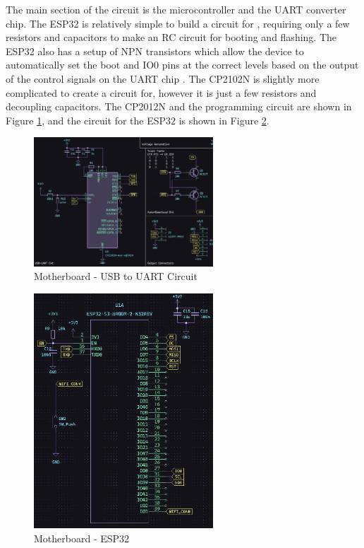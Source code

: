 \documentclass[12pt]{article}
\begin{document}
    The main section of the circuit is the microcontroller and the UART converter chip. The ESP32 is relatively simple to build a circuit for \cite{esp32}, requiring only a few resistors and capacitors to make an RC circuit for booting and flashing. The ESP32 also has a setup of NPN transistors which allow the device to automatically set the boot and IO0 pins at the correct levels based on the output of the control signals on the UART chip \cite{esp32, UART}. The CP2102N is slightly more complicated to create a circuit for, however it is just a few resistors and decoupling capacitors. The CP2012N and the programming circuit are shown in Figure \ref{pcb_uart}, and the circuit for the ESP32 is shown in Figure \ref{pcb_esp32}.

    \begin{figure}[hbt!]
        \centering
        \includegraphics[width=0.6\textwidth]{images/pcb_uart.png}
        \caption{Motherboard - USB to UART Circuit}
        \label{pcb_uart}
    \end{figure}

    \begin{figure}[hbt!]
        \centering
        \includegraphics[width=0.6\textwidth]{images/pcb_esp32.png}
        \caption{Motherboard - ESP32}
        \label{pcb_esp32}
    \end{figure}
\end{document}
